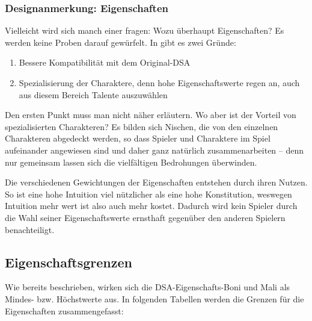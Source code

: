 \begin{design}
\subsubsection{Designanmerkung: Eigenschaften}
Vielleicht wird sich manch einer fragen: Wozu überhaupt Eigenschaften? Es werden keine Proben darauf gewürfelt. In \StoryDSA gibt es zwei Gründe:
\begin{enumerate}
  \item Bessere Kompatibilität mit dem Original-DSA
  \item Spezialisierung der Charaktere, denn hohe Eigenschaftswerte regen an, auch aus diesem Bereich Talente auszuwählen
\end{enumerate}
Den ersten Punkt muss man nicht näher erläutern. Wo aber ist der Vorteil von spezialisierten Charakteren? Es bilden sich Nischen, die von den einzelnen Charakteren abgedeckt werden, so dass Spieler und Charaktere im Spiel aufeinander angewiesen sind und daher ganz natürlich zusammenarbeiten -- denn nur gemeinsam lassen sich die vielfältigen Bedrohungen überwinden.

Die verschiedenen Gewichtungen der Eigenschaften entstehen durch ihren Nutzen. So ist eine hohe Intuition viel nützlicher als eine hohe Konstitution, weswegen Intuition mehr wert ist also auch mehr kostet. Dadurch wird kein Spieler durch die Wahl seiner Eigenschaftswerte ernsthaft gegenüber den anderen Spielern benachteiligt.
\end{design}


\BN
\subsection{Eigenschaftsgrenzen}

Wie bereits beschrieben, wirken sich die DSA-Eigenschafts-Boni und Mali als Mindes- bzw. Höchstwerte aus. In folgenden Tabellen werden die Grenzen für die Eigenschaften zusammengefasst:

